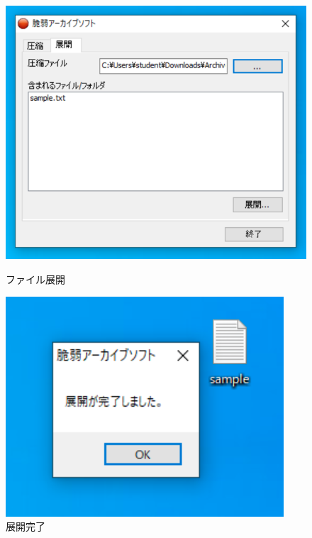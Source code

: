 \documentclass[dvipdfmx,autodetect-engine,titlepage]{jsarticle}
\begin{document}
\begin{figure}[H]
  \centering
  \begin{minipage}[b]{0.45\linewidth}
  \begin{center}
    \includegraphics[keepaspectratio,scale=0.6]{fg1.png}
    \end{center}
    \caption{ファイル展開}
  \end{minipage}
  \begin{minipage}[b]{0.45\linewidth}
  \begin{center}
    \includegraphics[keepaspectratio,scale=0.8]{fg2.png}
    \end{center}
    \caption{展開完了}
  \end{minipage}
\end{figure}
\end{document}
